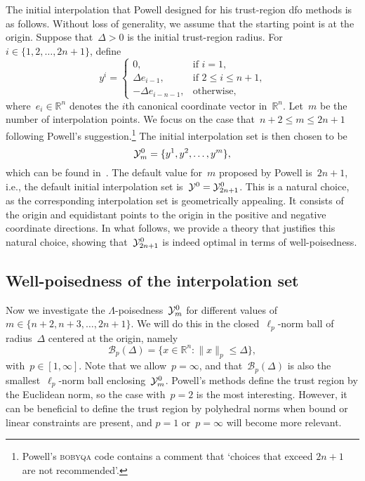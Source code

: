 \documentclass[draft]{article}
\numberwithin{equation}{section}
\theoremstyle{definition}
\theoremstyle{plain}
\theoremstyle{remark}
\newcommand*{\norm}[2][]{#1\lVert#2#1\rVert}
\newcommand*{\R}{\mathbb{R}}
\newcommand*{\set}[2][]{#1\{#2#1\}}
\newcommand*{\solvername}[1]{\textsc{#1}\xspace}
\newcommand*{\xpt}[1][]{\mathcal{Y}\ifblank{#1}{}{^{#1}}}
\begin{document}
The initial interpolation that Powell designed for his trust-region \gls{dfo} methods is as follows.
Without loss of generality, we assume that the starting point is at the origin.
Suppose that~$\Delta > 0$ is the initial trust-region radius.
For~$i \in \set{1, 2, \dots, 2n + 1}$, define
\begin{equation}
    \label{eq:set-def}
    y^i =
    \begin{cases}
        0,                      & \text{if~$i = 1$,}\\
        \Delta e_{i - 1},       & \text{if~$2 \le i \le n + 1$,}\\
        -\Delta e_{i - n - 1},  & \text{otherwise},
    \end{cases}
\end{equation}
where~$e_i \in \R^n$ denotes the $i$th canonical coordinate vector in~$\R^n$.
Let~$m$ be the number of interpolation points. We focus on the case that~$n+2 \le m \le 2n+1$
following Powell's suggestion.\footnote{
Powell's \solvername{bobyqa} code contains a comment that `choices that exceed $2n+1$ are not recommended'.
}
The initial interpolation set is then chosen to be
\begin{equation}
    \label{eq:set-def-m}
    \xpt[0]_m = \set{y^1, y^2, \dots, y^m},
\end{equation}
which can be found in~\cite[eq.~(3.2)]{Powell_2006}.
The default value for~$m$ proposed by Powell is~$2n + 1$, i.e., the default initial interpolation
set is~$\xpt[0] = \xpt[0]_{2n + 1}$.
This is a natural choice, as the corresponding interpolation set is geometrically appealing.
It consists of the origin and equidistant points to the origin in the positive and negative coordinate directions.
In what follows, we provide a theory that justifies this natural choice, showing that~$\xpt[0]_{2n + 1}$
is indeed optimal in terms of well-poisedness.

\subsection{Well-poisedness of the interpolation set}

Now we investigate the $\Lambda$-poisedness~$\xpt[0]_m$ for different values of~$m \in \{n+2, n+3, \dots, 2n+1\}$.
We will do this in the closed~$\ell_p$-norm ball of radius~$\Delta$ centered at the origin, namely
\begin{equation*}
    \mathcal{B}_p(\Delta) = \set{x \in \R^n : \norm{x}_p \le \Delta},
\end{equation*}
with~$p \in [1, \infty]$.
Note that we allow~$p = \infty$, and that~$\mathcal{B}_p(\Delta)$ is also the smallest~$\ell_p$-norm ball enclosing~$\xpt[0]_m$.
Powell's methods define the trust region by the Euclidean norm, so the case with~$p=2$ is the most
interesting. However, it can be beneficial to define the trust region by polyhedral norms when bound
or linear constraints are present, and $p=1$ or~$p=\infty$ will become more relevant.
\end{document}
